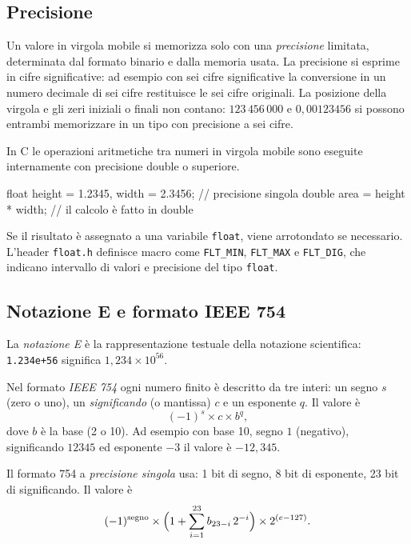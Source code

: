 \documentclass[11pt,a4paper]{article}
\begin{document}
\subsection{Precisione}

Un valore in virgola mobile si memorizza solo con una \emph{precisione} limitata,
determinata dal formato binario e dalla memoria usata. La precisione si esprime in
cifre significative: ad esempio con sei cifre significative la conversione in un
numero decimale di sei cifre restituisce le sei cifre originali. La posizione della
virgola e gli zeri iniziali o finali non contano: $123\,456\,000$ e
$0{,}00123456$ si possono entrambi memorizzare in un tipo con precisione a sei
cifre.

In C le operazioni aritmetiche tra numeri in virgola mobile sono eseguite
internamente con precisione double o superiore.

\begin{codice}
float height = 1.2345, width = 2.3456;   // precisione singola
double area = height * width;            // il calcolo è fatto in double
\end{codice}

Se il risultato è assegnato a una variabile \lstinline|float|, viene arrotondato
se necessario. L'header \lstinline|float.h| definisce macro come
\lstinline|FLT_MIN|, \lstinline|FLT_MAX| e \lstinline|FLT_DIG|, che indicano
intervallo di valori e precisione del tipo \lstinline|float|.

\subsection{Notazione E e formato IEEE 754}

La \emph{notazione E} è la rappresentazione testuale della notazione scientifica:
\texttt{1.234e+56} significa $1{,}234 \times 10^{56}$.

Nel formato \emph{IEEE 754} ogni numero finito è descritto da tre interi: un segno
$s$ (zero o uno), un \emph{significando} (o mantissa) $c$ e un esponente $q$. Il
valore è
\[
  (-1)^s \times c \times b^q ,
\]
dove $b$ è la base (2 o 10). Ad esempio con base 10, segno $1$ (negativo),
significando $12345$ ed esponente $-3$ il valore è $-12{,}345$.

Il formato 754 a \emph{precisione singola} usa: 1 bit di segno, 8 bit di esponente,
23 bit di significando. Il valore è
\[
  (-1)^{\text{segno}} \times \Bigl( 1 + \sum_{i=1}^{23} b_{23-i}\, 2^{-i} \Bigr)
  \times 2^{(e - 127)} .
\]
\end{document}

